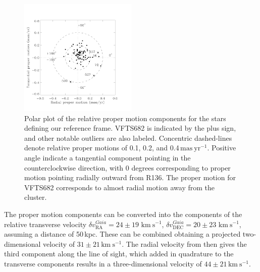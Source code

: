 \documentclass[apjl,twocolumn]{emulateapj}
\newcommand{\kms}{{\,\mathrm{km\ s^{-1}}}}
\begin{document}
\begin{figure}%
  \centering
  \includegraphics[width=0.5\textwidth]{figures/figure_polar_682-1.pdf}
  \caption{Polar plot of the relative proper motion components for the stars
    defining our reference frame. VFTS682 is indicated by the plus sign, and
    other notable outliers \citep[see][]{lennon:18} are also labeled. Concentric dashed-lines denote relative proper motions of
    0.1, 0.2, and 0.4$\,\mathrm{mas\ yr^{-1}}$. Positive angle
    indicate a tangential component pointing in the counterclockwise
    direction, with 0 degrees corresponding to proper motion pointing
    radially outward from R136. The proper motion for VFTS682
    corresponds to almost radial motion away from the cluster.
  }
  \label{fig:pm_polar}
\end{figure}



The proper motion components can be converted into
the components of the relative transverse velocity $\delta v_\mathrm{RA}^{Gaia}=24\pm19\,\kms$,
$\delta v_\mathrm{DEC}^{Gaia}=20\pm23\,\kms$, assuming a distance of
50\,kpc. These can be combined obtaining a projected two-dimensional
velocity of $31\pm21\kms$. %
The radial velocity from
\cite{bestenlehner:11} then gives the third component along
the line of sight, %
which added in quadrature to the transverse components results in a
three-dimensional velocity of $44 \pm 21\kms$.
\end{document}
